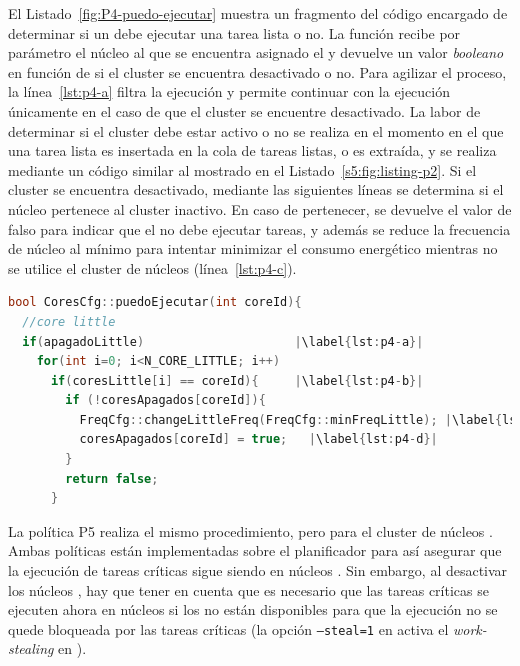 El Listado~\ref{fig:P4-puedo-ejecutar} muestra un fragmento del código
encargado de determinar si un \wt debe ejecutar una tarea lista o no. La
función recibe por parámetro el núcleo al que se encuentra asignado el \wt
y devuelve un valor \emph{booleano} en función de si el cluster se
encuentra desactivado o no. Para agilizar el proceso, la
línea~\ref{lst:p4-a} filtra la ejecución y permite continuar con la
ejecución únicamente en el caso de que el cluster se encuentre
desactivado. La labor de determinar si el cluster debe estar activo o no se
realiza en el momento en el que una tarea lista es insertada en la cola de
tareas listas, o es extraída, y se realiza mediante un código similar
al mostrado en el Listado~\ref{s5:fig:listing-p2}. Si el cluster se encuentra
desactivado, mediante las siguientes líneas se determina si el núcleo
pertenece al cluster inactivo. En caso de pertenecer, se devuelve el
valor de falso para indicar que el \wt no debe ejecutar tareas, y además
se reduce la frecuencia de núcleo al mínimo para intentar minimizar el
consumo energético mientras no se utilice el cluster de núcleos \LITTLE
(línea~\ref{lst:p4-c}).


\begin{lstlisting}[float,language=C++,caption={Fragmento de código para determinar si asignar una tarea a un
    \wt o no.},label={fig:P4-puedo-ejecutar}]
bool CoresCfg::puedoEjecutar(int coreId){
  //core little
  if(apagadoLittle)                     |\label{lst:p4-a}|
    for(int i=0; i<N_CORE_LITTLE; i++)
      if(coresLittle[i] == coreId){     |\label{lst:p4-b}|
        if (!coresApagados[coreId]){
          FreqCfg::changeLittleFreq(FreqCfg::minFreqLittle); |\label{lst:p4-c}|
          coresApagados[coreId] = true;   |\label{lst:p4-d}|
        }
        return false;
      }
\end{lstlisting}


La política P5 realiza el mismo procedimiento, pero para el cluster de
núcleos \BIG. Ambas políticas están implementadas sobre el planificador
\botlev para así asegurar que la ejecución de tareas críticas sigue siendo
en núcleos \BIG. Sin embargo, al desactivar los núcleos \BIG, hay que tener
en cuenta que es necesario que las tareas críticas se ejecuten ahora en
núcleos \LITTLE si los \BIG no están disponibles para que la ejecución no
se quede bloqueada por las tareas críticas (la opción \texttt{--steal=1} en
\botlev activa el {\em work-stealing} en \nanos).

